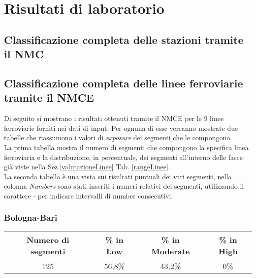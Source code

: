 
\chapter{Risultati di laboratorio}
\label{risultati}
\section{Classificazione completa delle stazioni tramite il NMC}
\label{risultaticompleti}
\section{Classificazione completa delle linee ferroviarie tramite il NMCE}
Di seguito si mostrano i risultati ottenuti tramite il NMCE per le 9 linee ferroviarie forniti nei dati di input. Per ognuna di esse verranno mostrate due tabelle che riassumono i valori di \textit{exposure} dei segmenti  che le compongono.\\
La prima tabella mostra il numero di segmenti che compongono la specifica linea ferroviaria e la distribuzione, in percentuale, dei segmenti all'interno delle fasce già viste  nella Sez.\ref{valutazioneLinee}  Tab. \ref{rangeLinee}.\\
La seconda tabella è una vista sui risultati puntuali dei vari segmenti, nella colonna \textit{Numbers} sono stati inseriti i numeri relativi dei segmenti, utilizzando il carattere \textit{-} per indicare intervalli di number consecutivi. 
\subsection{Bologna-Bari}
\label{app:bolognabari}
\centering
	\begin{tabular}  {|c|c|c|c|} 
	
		\hline 
		Numero di segmenti & \% in Low & \% in Moderate & \% in High \\ 
		\hline 
		125 & 56,8\% & 43,2\% & 0\% \\ 
		\hline 
	\end{tabular} 

